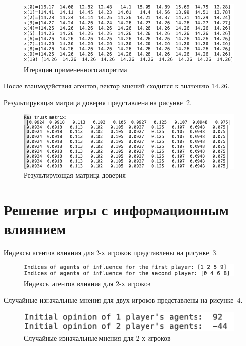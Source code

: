 \begin{figure}
  \centering
  \includegraphics[scale=0.6]{../../artifacts/rk3/3.png}
  \caption{Итерации примененного алоритма}
  \label{fig:fig03}
\end{figure}

После взаимодействия агентов, вектор мнений сходится к значению $14.26$.

Результирующая матрица доверия представлена на рисунке~\ref{fig:fig04}.

\begin{figure}
  \centering
  \includegraphics[scale=0.6]{../../artifacts/rk3/4.png}
  \caption{Результирующая матрица доверия}
  \label{fig:fig04}
\end{figure}

\section{Решение игры с информационным влиянием}

Индексы агентов влияния для 2-х игроков представлены на рисунке~\ref{fig:fig05}.

\begin{figure}
  \centering
  \includegraphics[scale=0.6]{../../artifacts/rk3/5.png}
  \caption{Индексы агентов влияния для 2-х игроков}
  \label{fig:fig05}
\end{figure}

Случайные изначальные мнения для двух игроков представлены на рисунке~\ref{fig:fig06}.

\begin{figure}
  \centering
  \includegraphics[scale=0.6]{../../artifacts/rk3/6.png}
  \caption{Случайные изначальные мнения для 2-х игроков}
  \label{fig:fig06}
\end{figure}

